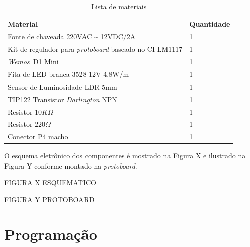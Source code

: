 \begin{table}
    \centering
    \caption{Lista de materiais}
    \label{BOM}
    \begin{tabular}{ll} 
        \hline
        Material                                                       & Quantidade  \\ 
        \hline
        \hline
        Fonte de chaveada 220VAC \textasciitilde{} 12VDC/2A            & 1           \\ 
        \hline
        Kit de regulador para \textit{protoboard} baseado no CI LM1117 & 1           \\ 
        \hline
        \textit{Wemos~}D1 Mini                                         & 1           \\ 
        \hline
        Fita de LED branca 3528 12V 4.8W/m                             & 1           \\ 
        \hline
        Sensor de Luminosidade LDR 5mm                                 & 1           \\ 
        \hline
        TIP122 Transistor \textit{Darlington} NPN                      & 1           \\ 
        \hline
        Resistor $10K\Omega$                                           & 1           \\ 
        \hline
        Resistor $220\Omega$                                           & 1           \\ 
        \hline
        Conector P4 macho                                              & 1           \\
        \hline
    \end{tabular}
\end{table}

O esquema eletrônico dos componentes é mostrado na Figura X e ilustrado na Figura Y conforme montado na \textit{protoboard}.

FIGURA X ESQUEMATICO

FIGURA Y PROTOBOARD

\section{Programação}


